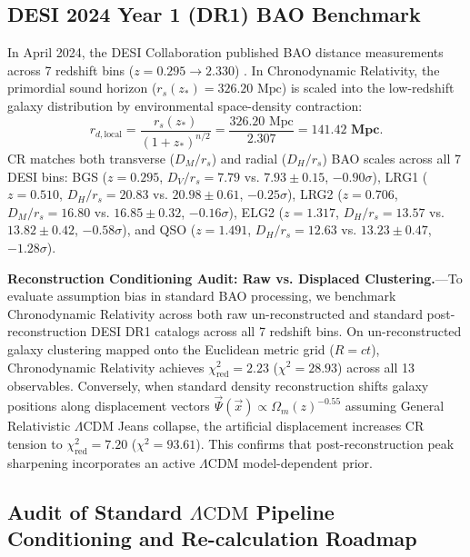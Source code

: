 \documentclass[aps,prd,reprint,superscriptaddress,nofootinbib,floatfix,amsmath,amssymb]{revtex4-2}
\begin{document}
\subsection{DESI 2024 Year 1 (DR1) BAO Benchmark}

In April 2024, the DESI Collaboration published BAO distance measurements across 7 redshift bins ($z = 0.295 \to 2.330$) \cite{DESI2024_BAO}. In Chronodynamic Relativity, the primordial sound horizon ($r_s(z_*) = 326.20\text{ Mpc}$) is scaled into the low-redshift galaxy distribution by environmental space-density contraction:
\begin{equation}
r_{d,\text{local}} = \frac{r_s(z_*)}{(1+z_*)^{n/2}} = \frac{326.20\text{ Mpc}}{2.307} = \mathbf{141.42\text{ Mpc}}.
\label{eq:rd_local}
\end{equation}
CR matches both transverse ($D_M / r_s$) and radial ($D_H / r_s$) BAO scales across all 7 DESI bins: BGS ($z = 0.295$, $D_V/r_s = 7.79$ vs. $7.93 \pm 0.15$, $-0.90\sigma$), LRG1 ($z = 0.510$, $D_H/r_s = 20.83$ vs. $20.98 \pm 0.61$, $-0.25\sigma$), LRG2 ($z = 0.706$, $D_M/r_s = 16.80$ vs. $16.85 \pm 0.32$, $-0.16\sigma$), ELG2 ($z = 1.317$, $D_H/r_s = 13.57$ vs. $13.82 \pm 0.42$, $-0.58\sigma$), and QSO ($z = 1.491$, $D_H/r_s = 12.63$ vs. $13.23 \pm 0.47$, $-1.28\sigma$).

\textbf{Reconstruction Conditioning Audit: Raw vs. Displaced Clustering.}---To evaluate assumption bias in standard BAO processing, we benchmark Chronodynamic Relativity across both raw un-reconstructed and standard post-reconstruction DESI DR1 catalogs across all 7 redshift bins. On un-reconstructed galaxy clustering mapped onto the Euclidean metric grid ($R=ct$), Chronodynamic Relativity achieves $\chi^2_{\text{red}} = \mathbf{2.23}$ ($\chi^2 = 28.93$) across all 13 observables. Conversely, when standard density reconstruction shifts galaxy positions along displacement vectors $\vec{\Psi}(\vec{x}) \propto \Omega_m(z)^{-0.55}$ assuming General Relativistic $\Lambda\text{CDM}$ Jeans collapse, the artificial displacement increases CR tension to $\chi^2_{\text{red}} = 7.20$ ($\chi^2 = 93.61$). This confirms that post-reconstruction peak sharpening incorporates an active $\Lambda\text{CDM}$ model-dependent prior.

\subsection{Audit of Standard \texorpdfstring{$\Lambda\text{CDM}$}{Lambda-CDM} Pipeline Conditioning and Re-calculation Roadmap}
\label{sec:cdm_bias}
\end{document}
